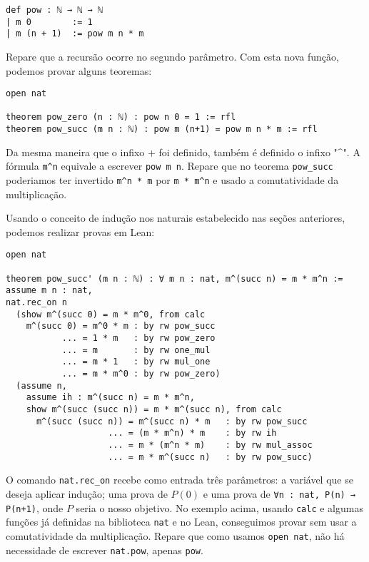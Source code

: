 \begin{lstlisting}
def pow : ℕ → ℕ → ℕ
| m 0        := 1
| m (n + 1)  := pow m n * m
\end{lstlisting}

Repare que a recursão ocorre no segundo parâmetro. Com esta nova função, podemos provar alguns teoremas:

\begin{lstlisting}
open nat

theorem pow_zero (n : ℕ) : pow n 0 = 1 := rfl
theorem pow_succ (m n : ℕ) : pow m (n+1) = pow m n * m := rfl
\end{lstlisting}

Da mesma maneira que o infixo $+$ foi definido, também é definido o infixo "\textasciicircum ". A fórmula \lstinline{m^n} equivale a escrever \lstinline{pow m n}. Repare que no teorema \lstinline{pow_succ} poderiamos ter invertido \lstinline{m^n * m} por \lstinline{m * m^n} e usado a comutatividade da multiplicação.

Usando o conceito de indução nos naturais estabelecido nas seções anteriores, podemos realizar provas em Lean:

\begin{lstlisting}
open nat

theorem pow_succ' (m n : ℕ) : ∀ m n : nat, m^(succ n) = m * m^n :=
assume m n : nat,
nat.rec_on n 
  (show m^(succ 0) = m * m^0, from calc
    m^(succ 0) = m^0 * m : by rw pow_succ
           ... = 1 * m   : by rw pow_zero
           ... = m       : by rw one_mul
           ... = m * 1   : by rw mul_one
           ... = m * m^0 : by rw pow_zero)
  (assume n,
    assume ih : m^(succ n) = m * m^n,
    show m^(succ (succ n)) = m * m^(succ n), from calc
      m^(succ (succ n)) = m^(succ n) * m   : by rw pow_succ
                    ... = (m * m^n) * m    : by rw ih
                    ... = m * (m^n * m)    : by rw mul_assoc
                    ... = m * m^(succ n)   : by rw pow_succ)
\end{lstlisting}

O comando \lstinline{nat.rec_on} recebe como entrada três parâmetros: a variável que se deseja aplicar indução; uma prova de $P(0)$ e uma prova de \lstinline{∀n : nat, P(n) → P(n+1)}, onde $P$ seria o nosso objetivo. No exemplo acima, usando \lstinline{calc} e algumas funções já definidas na biblioteca \lstinline{nat} e no Lean, conseguimos provar sem usar a comutatividade da multiplicação. Repare que como usamos \lstinline{open nat}, não há necessidade de escrever \lstinline{nat.pow}, apenas \lstinline{pow}.


